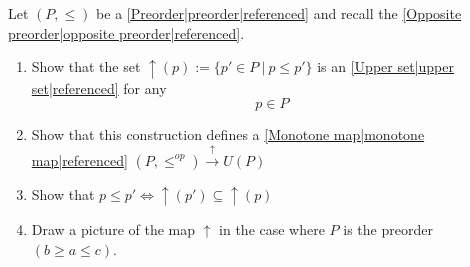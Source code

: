 

Let $(P, \leq)$ be a \ref{Preorder|preorder|referenced} and recall the \ref{Opposite preorder|opposite preorder|referenced}.
\begin{enumerate}
    \item Show that the set $\uparrow(p) := \{p' \in P\ |\ p \leq p'\}$ is an \ref{Upper set|upper set|referenced} for any $$p \in P$$
    \item Show that this construction defines a \ref{Monotone map|monotone map|referenced} $(P, \leq^{op}) \xrightarrow{\uparrow} U(P)$
    \item Show that $p \leq p' \iff \uparrow(p') \subseteq \uparrow(p)$
    \item Draw a picture of the map $\uparrow$ in the case where $P$ is the preorder $(b\geq a \leq c)$.

  \end{enumerate}